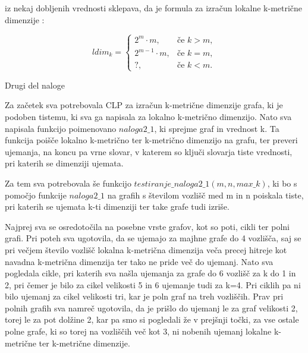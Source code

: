 \documentclass[12pt,a4paper]{amsart}
\makeatletter
\renewcommand\subsection{\@startsection{subsection}{2}%
  \z@{.5\linespacing\@plus.7\linespacing}{.5\linespacing}%
  {\normalfont\scshape}}
\theoremstyle{plain} %
\makeatother
\begin{document}
\begin{enumerate}
\begin{table}[h]
\begin{center}
\begin{tabular}{|c|c|c|c|c|c|}
            \hline
        \end{tabular}
    \end{center}
    
    
\end{table}

iz nekaj dobljenih vrednosti sklepava, da je formula za izračun lokalne k-metrične dimenzije :

\begin{equation}
ldim_k =
\begin{cases}
  2^m \cdot m, & \text{če } k > m, \\
  2^{m-1} \cdot m, & \text{če } k = m,\\
  ?, & \text{če } k < m. \nonumber
\end{cases}
\end{equation}


\end{enumerate}  



\bigskip


\subsection{Drugi del naloge}

Za začetek sva potrebovala CLP za izračun k-metrične dimenzije grafa, ki je podoben tistemu, 
ki sva ga napisala za lokalno k-metrično dimenzijo.  
Nato sva napisala funkcijo poimenovano $naloga2\_1$, ki sprejme graf in vrednost k. Ta funkcija poišče lokalno k-metrično ter k-metrično dimenzijo na grafu, ter preveri ujemanja, na koncu pa vrne slovar, v katerem so ključi slovarja tiste vrednosti, pri katerih se dimenziji ujemata.

Za tem sva potrebovala še funkcijo $testiranje\_naloga2\_1(m, n, max\_k)$, 
ki bo s pomočjo funkcije $naloga2\_1$ na grafih s številom vozlišč med m in n poiskala 
tiste, pri katerih se ujemata k-ti dimenziji ter take grafe tudi izriše.

Najprej sva se osredotočila na posebne vrste grafov, kot so poti, cikli ter polni grafi. 
Pri poteh sva ugotovila, da se ujemajo za majhne grafe do 4 vozlišča, saj se pri 
večjem število vozlišč lokalna k-metrična dimenzija veča precej hitreje kot navadna 
k-metrična dimenzija ter tako ne pride več do ujemanj. Nato sva pogledala cikle, pri 
katerih sva našla ujemanja za grafe do 6 vozlišč za k do 1 in 2, pri čemer je bilo za 
cikel velikosti 5 in 6 ujemanje tudi za k=4. Pri ciklih pa ni bilo ujemanj za cikel 
velikosti tri, kar je poln graf na treh vozliščih. Prav pri polnih grafih sva namreč 
ugotovila, da je prišlo do ujemanj le za graf velikosti 2, torej le za pot 
dolžine 2, kar pa smo si pogledali že v prejšnji točki, za vse ostale polne grafe, 
ki so torej na vozliščih več kot 3, ni nobenih ujemanj lokalne k-metrične ter 
k-metrične dimenzije.
\end{document}

